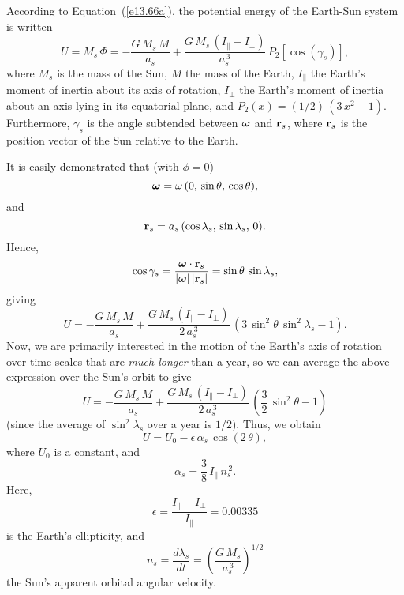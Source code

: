 According to Equation~(\ref{e13.66a}), the potential energy of
the Earth-Sun system is written
\begin{equation}
U = M_s\,\Phi = - \frac{G\,M_s\,M}{a_s} + \frac{G\,M_s\,(I_\parallel-I_\perp)}{a_s^{\,3}}\,P_2[\cos(\gamma_s)],
\end{equation}
where $M_s$ is the mass of the Sun, $M$ the mass of the Earth,
$I_\parallel$ the Earth's moment of inertia about its axis of rotation,
$I_\perp$ the Earth's moment of inertia about an axis lying in its
equatorial plane, and $P_2(x)=(1/2)\,(3\,x^2-1)$.  Furthermore, $\gamma_s$ is the angle subtended
between $\mbox{\boldmath$\omega$}$ and ${\bf r}_s$, where ${\bf r}_s$ is the 
position vector of the Sun relative to the Earth.

It is easily demonstrated that (with $\phi=0$)
\begin{equation}
\mbox{\boldmath$\omega$}  = \omega\,(0,\,\sin\theta,\,\cos\theta),
\end{equation}
and
\begin{equation}
{\bf r}_s = a_s\,(\cos\lambda_s,\,\sin\lambda_s,\,0).
\end{equation}
Hence,
\begin{equation}
\cos\gamma_s =\frac{\mbox{\boldmath$\omega$}\cdot{\bf r}_s}{|\mbox{\boldmath$\omega$}|\,|{\bf r}_s|}= \sin\theta\,\sin\lambda_s,
\end{equation}
giving
\begin{equation}
U = - \frac{G\,M_s\,M}{a_s} + \frac{G\,M_s\,(I_\parallel-I_\perp)}{2\,a_s^{\,3}}\,(3\,\sin^2\theta\,\sin^2\lambda_s -1).
\end{equation}
Now, we are primarily interested in the motion of the Earth's axis of rotation over time-scales that are {\em much
longer}\/ than a year, so we can average the above
expression over the Sun's orbit to give
\begin{equation}
U = - \frac{G\,M_s\,M}{a_s} + \frac{G\,M_s\,(I_\parallel-I_\perp)}{2\,a_s^{\,3}}\,\left(\frac{3}{2}\,\sin^2\theta -1\right)
\end{equation}
(since the average of $\sin^2\lambda_s$ over a year is $1/2$).
Thus, we obtain
\begin{equation}\label{e13.93}
U = U_0 - \epsilon\,\alpha_s\,\cos(2\,\theta),
\end{equation}
where $U_0$ is a constant, and
\begin{equation}\label{e13.95}
\alpha_s = \frac{3}{8}\,I_\parallel\,n_s^{\,2}.
\end{equation}
Here, 
\begin{equation}
\epsilon = \frac{I_{\parallel}-I_\perp}{I_\parallel}=0.00335
\end{equation}
is the Earth's ellipticity,
and
\begin{equation}
n_s =\frac{d\lambda_s}{dt}=  \left(\frac{G\,M_s}{a_s^{\,3}}\right)^{1/2}
\end{equation}
the Sun's apparent orbital angular velocity. 

